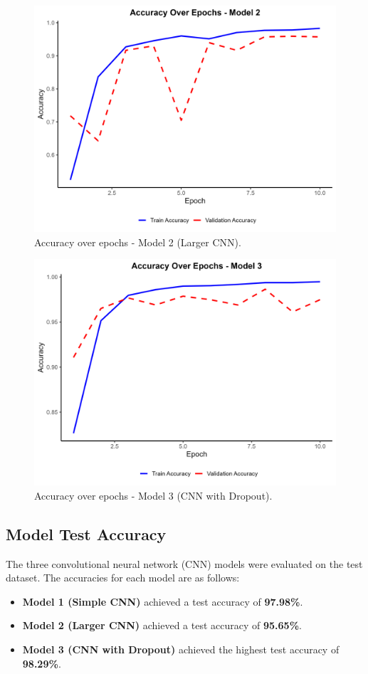 \documentclass[a4paper,12pt]{article}
\begin{document}
\begin{figure}[H]
    \centering
    \includegraphics[width=0.8\linewidth]{results/accuracy_plot_model_2.png}
    \caption{Accuracy over epochs - Model 2 (Larger CNN).}
\end{figure}

\begin{figure}[H]
    \centering
    \includegraphics[width=0.8\linewidth]{results/accuracy_plot_model_3.png}
    \caption{Accuracy over epochs - Model 3 (CNN with Dropout).}
\end{figure}

\subsection{Model Test Accuracy}
The three convolutional neural network (CNN) models were evaluated on the test dataset. The accuracies for each model are as follows:

\begin{itemize}
    \item \textbf{Model 1 (Simple CNN)} achieved a test accuracy of \textbf{97.98\%}.
    \item \textbf{Model 2 (Larger CNN)} achieved a test accuracy of \textbf{95.65\%}.
    \item \textbf{Model 3 (CNN with Dropout)} achieved the highest test accuracy of \textbf{98.29\%}.
\end{itemize}
\end{document}

